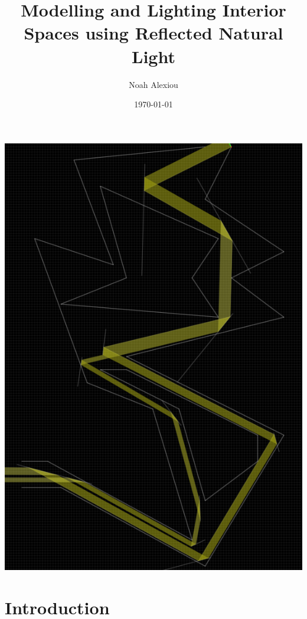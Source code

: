 \documentclass[11pt, letterpaper]{article}
\begin{document}
\begin{titlepage}
	\title{Modelling and Lighting Interior Spaces using Reflected Natural Light}
	\author{Noah Alexiou}
	\date{\today}
	
	\maketitle
	\centering
	\includegraphics[width=14cm]{cave2.png}
	
\end{titlepage}

\newpage
\tableofcontents


\newpage

\section{Introduction}
\end{document}
